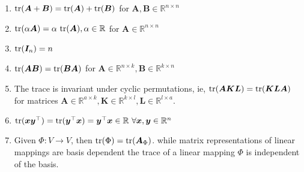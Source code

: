 \begin{enumerate}
    \item $\text{tr}(\bm{A} + \bm{B}) = \text{tr}(\bm{A}) + \text{tr}(\bm{B})$ for $\bm{A}, \bm{B} \in \mathbb{R}^{n\times n}$
    \hfill \cite{mfml/book/mml/Deisenroth-Faisal-Ong}

    \item $\tr(\alpha \bm{A}) = \alpha\ \tr(\bm{A}), \alpha \in \mathbb{R}$ for $\bm{A} \in \mathbb{R}^{n\times n}$
    \hfill \cite{mfml/book/mml/Deisenroth-Faisal-Ong}
    
    \item $\text{tr}(\bm{I}_n) = n$
    \hfill \cite{mfml/book/mml/Deisenroth-Faisal-Ong}
    
    \item $\text{tr}(\bm{AB}) = \text{tr}(\bm{BA})$ for $\bm{A} \in \mathbb{R}^{n\times k}, \bm{B} \in \mathbb{R}^{k\times n}$
    \hfill \cite{mfml/book/mml/Deisenroth-Faisal-Ong}

    \item The trace is invariant under cyclic permutations, ie, $\text{tr}(\bm{AKL}) = \text{tr}(\bm{KLA})$ for matrices $\bm{A} \in  \mathbb{R}^{a \times k}, \bm{K} \in  \mathbb{R}^{k \times l}, \bm{L} \in  \mathbb{R}^{l \times a}$. 
    \hfill \cite{mfml/book/mml/Deisenroth-Faisal-Ong}

    \item $
        \tr(\bm{xy}^\top) = \tr(\bm{y} ^\top \bm{x}) = \bm{y} ^\top \bm{x} \in \mathbb{R}\ 
        \forall \bm{x}, \bm{y} \in \mathbb{R}^n
    $
    \hfill \cite{mfml/book/mml/Deisenroth-Faisal-Ong}

    \item Given $\Phi : V \to V$, then $\text{tr}(\Phi) = \text{tr}(\bm{A}_\Phi)$. while matrix representations of linear mappings are basis dependent the trace of a linear mapping $\Phi$ is independent of the basis.
    \hfill \cite{mfml/book/mml/Deisenroth-Faisal-Ong}
\end{enumerate}







